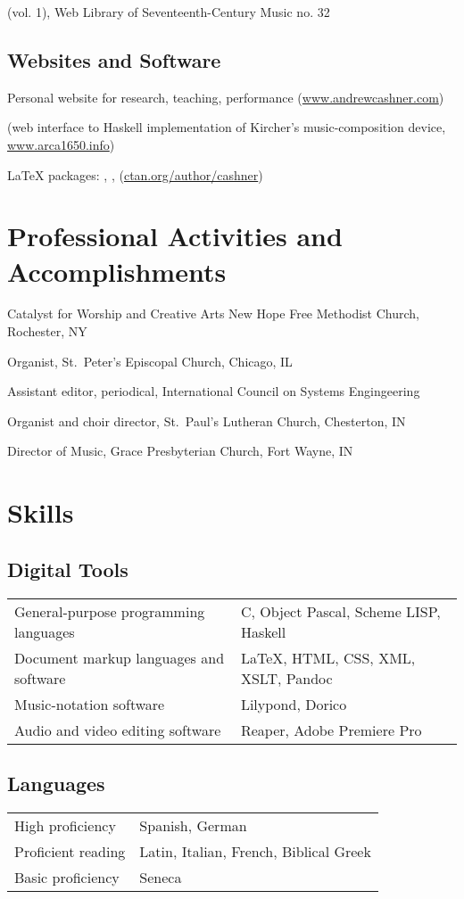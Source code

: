 \documentclass[11pt]{article}
\begin{document}
{
(vol. 1), Web Library of Seventeenth-Century Music no. 32}

\subsection{Websites and Software}

{Personal website for research, teaching, performance (\url{www.andrewcashner.com})}

{ (web interface to Haskell implementation of Kircher's
music-composition device, \url{www.arca1650.info})}

{\LaTeX{} packages: , ,
 (\url{ctan.org/author/cashner})}

\section{Professional Activities and Accomplishments}
{Catalyst for Worship and Creative Arts
New Hope Free Methodist Church, Rochester, NY}

{Organist, St.\ Peter's Episcopal Church, Chicago, IL}

{Assistant editor,  periodical, International Council on
Systems Engingeering}
    
{Organist and choir director, St.\ Paul's Lutheran Church, Chesterton, IN}
    
{Director of Music, Grace Presbyterian Church, Fort Wayne, IN}


\section{Skills}
\subsection{Digital Tools}
\begin{tabular}{ll}
    General-purpose programming languages 
    & C, Object Pascal, Scheme LISP, Haskell \\
    Document markup languages and software
    & \LaTeX, HTML, CSS, XML, XSLT, Pandoc \\
    Music-notation software 
    & Lilypond, Dorico \\
    Audio and video editing software
    & Reaper, Adobe Premiere Pro
\end{tabular}

\subsection{Languages}
\begin{tabular}{ll}
    High proficiency & Spanish, German \\
    Proficient reading & Latin, Italian, French, Biblical Greek \\
    Basic proficiency & Seneca \\
\end{tabular}
\end{document}
